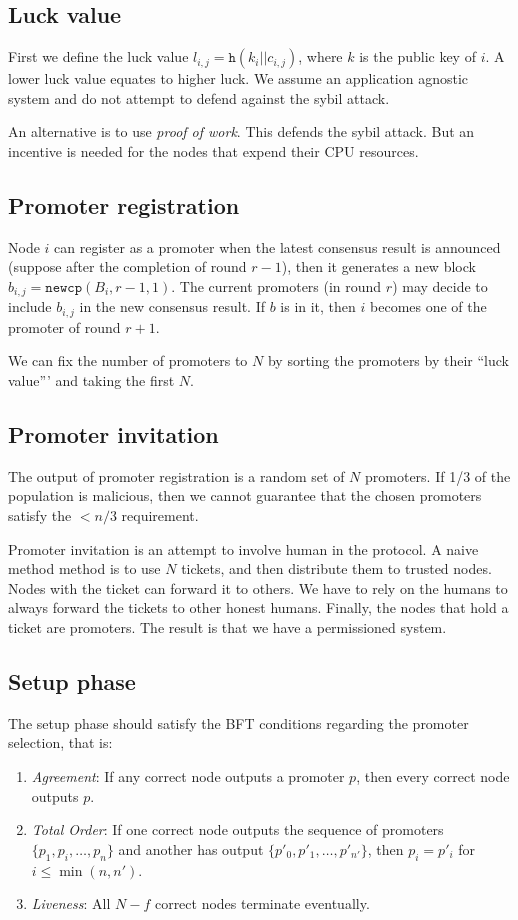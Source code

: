 \subsection{Luck value}
First we define the luck value $l_{i,j} = \texttt{h}(k_i || c_{i,j})$, where $k$
is the public key of $i$. A lower luck value equates to higher luck. We assume
an application agnostic system and do not attempt to defend against the sybil
attack.

An alternative is to use \emph{proof of work}. This defends the sybil attack.
But an incentive is needed for the nodes that expend their CPU resources.

\subsection{Promoter registration}
Node $i$ can register as a promoter when the latest consensus result is
announced (suppose after the completion of round $r-1$), then it generates a new
block $b_{i,j} = \texttt{newcp}(B_i, r-1, 1)$. The current promoters (in round
$r$) may decide to include $b_{i,j}$ in the new consensus result. If $b$ is in
it, then $i$ becomes one of the promoter of round $r+1$.

We can fix the number of promoters to $N$ by sorting the promoters by their
``luck value''' and taking the first $N$. 

\subsection{Promoter invitation}
The output of promoter registration is a random set of $N$ promoters. If 1/3 of
the population is malicious, then we cannot guarantee that the chosen promoters
satisfy the $< n/3$ requirement.

Promoter invitation is an attempt to involve human in the protocol. A naive
method method is to use $N$ tickets, and then distribute them to trusted nodes.
Nodes with the ticket can forward it to others. We have to rely on the humans to
always forward the tickets to other honest humans. Finally, the nodes that hold
a ticket are promoters. The result is that we have a permissioned system.

\subsection{Setup phase}
The setup phase should satisfy the BFT conditions regarding the promoter
selection, that is:
\begin{enumerate}
\item \emph{Agreement}: If any correct node outputs a promoter $p$, then every
  correct node outputs $p$.
\item \emph{Total Order}: If one correct node outputs the sequence of promoters
  $\{p_1, p_i, \dots, p_n\}$ and another has output $\{p'_0, p'_1, \dots,
  p'_{n'} \}$, then $p_i = p'_i$ for $i \le \min(n, n')$.
\item \emph{Liveness}: All $N - f$ correct nodes terminate eventually.
\end{enumerate}


